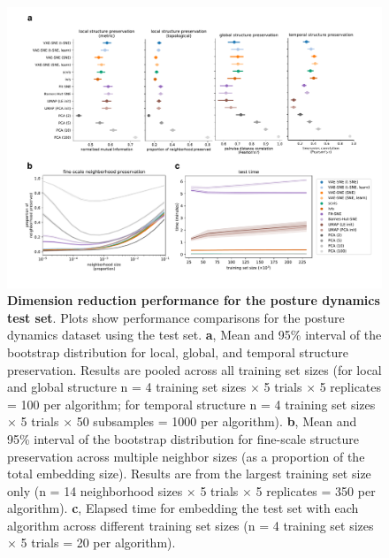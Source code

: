 \begin{figure}[!htb]
\includegraphics[width=\textwidth]{Graving_IMPRS_Thesis/figures/test_set_figure.pdf}

\caption{  \textbf{Dimension reduction performance for the posture dynamics test set}. Plots show performance comparisons for the posture dynamics dataset \citep{berman2014mapping, berman2016predictability, pereira2019fast} using the test set. \textbf{a}, Mean and 95\% interval of the bootstrap distribution for local, global, and temporal structure preservation. Results are pooled across all training set sizes (for local and global structure n = 4 training set sizes $\times$ 5 trials $\times$ 5 replicates = 100 per algorithm; for temporal structure n = 4 training set sizes $\times$ 5 trials $\times$ 50 subsamples = 1000 per algorithm). \textbf{b}, Mean and 95\% interval of the bootstrap distribution for fine-scale structure preservation across multiple neighbor sizes (as a proportion of the total embedding size). Results are from the largest training set size only (n = 14 neighborhood sizes $\times$ 5 trials $\times$ 5 replicates = 350 per algorithm). \textbf{c}, Elapsed time for embedding the test set with each algorithm across different training set sizes (n = 4 training set sizes $\times$ 5 trials = 20 per algorithm).}

\label{fig:test_set_figure} %

\end{figure}

